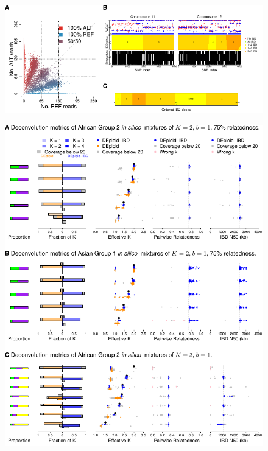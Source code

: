 \documentclass{article}
\begin{document}
\begin{figure}[htp]
  \begin{center}
  \includegraphics[width=\textwidth]{Fig1.pdf}
   \end{center}
\end{figure}
\newpage
\begin{figure}[htp]
  \begin{center}
  \includegraphics[width=\textwidth]{Fig2.pdf}
   \end{center}
\end{figure}
\end{document}
